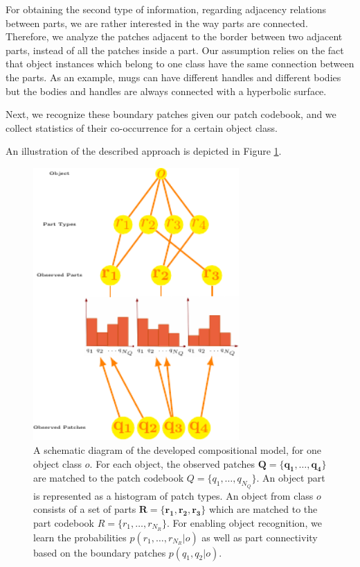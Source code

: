 \documentclass[a4paper,11pt,pdf]{pacmanreport}
\begin{document}
For obtaining the second type of information, regarding adjacency relations 
between parts, we are rather interested in the way parts are connected. 
Therefore, we analyze the patches adjacent to the border between two adjacent 
parts, instead of all the patches inside a part. Our assumption relies on the 
fact that object instances which belong to one class have the same connection 
between the parts. As an example, mugs can have different handles and different 
bodies but the bodies and handles are always connected with a hyperbolic 
surface.

Next, we recognize these boundary patches given our patch codebook,
and we collect statistics of their co-occurrence for a certain object
class.

An illustration of the described approach is depicted in Figure \ref{fig:rel}.

\begin{figure}[h!]
\begin{center}
\includegraphics[width=0.7\textwidth]{rel.pdf}
\end{center}
\caption{A schematic diagram of the developed compositional model, for one object class $o$. For each object, the observed patches 
$\mathbf{Q}=\{\mathbf{q_1},\ldots,\mathbf{q_4}\}$ are matched to the patch 
codebook $Q=\{q_1,\ldots,q_{N_{Q}}\}$. An object part is represented as a 
histogram of patch types. An object from class $o$ consists of a set of parts 
$\mathbf{R}=\{\mathbf{r_1},\mathbf{r_2},\mathbf{r_3}\}$ which are matched to the 
part codebook $R=\{r_1,\ldots,r_{N_{R}}\}$. For enabling object recognition, we 
learn the probabilities $p(r_1,\ldots,r_{N_{R}} \vert o)$ as well as part 
connectivity based on the boundary patches $p(q_{1},q_{2} \vert o)$.} 
\label{fig:rel}
\end{figure}
\end{document}
